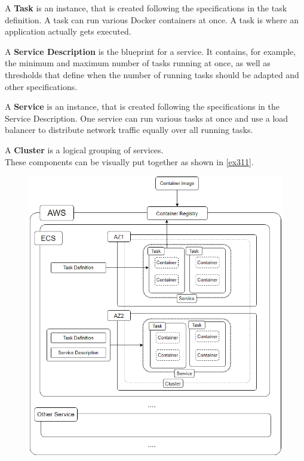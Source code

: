 A \textbf{Task} is an instance, that is created following the specifications in the task definition. A task can run various Docker containers at once. A task is where an application actually gets executed.

A \textbf{Service Description} is the blueprint for a service. It contains, for example, the minimum and maximum number of tasks running at once, as well as thresholds that define when the number of running tasks should be adapted and other specifications.

A \textbf{Service} is an instance, that is created following the specifications in the Service Description. One service can run various tasks at once and use a load balancer to distribute network traffic equally over all running tasks.

A \textbf{Cluster} is a logical grouping of services. \\

These components can be visually put together as shown in \autoref{ex311}.

\begin{figure}[h]
\centering
\includegraphics[scale=.8]{Bilder/EcsStructure.png}
\label{ex311}
\end{figure}


